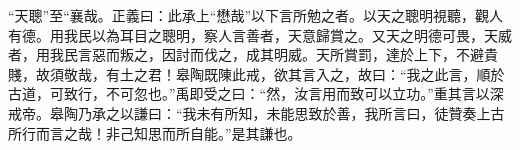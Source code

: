 {\noindent\shu{}\fzkt “天聰”至“襄哉。正義曰：此承上“懋哉”以下言所勉之者。以天之聰明視聽，觀人有德。用我民以為耳目之聰明，察人言善者，天意歸賞之。又天之明德可畏，天威者，用我民言惡而叛之，因討而伐之，成其明威。天所賞罰，達於上下，不避貴賤，故須敬哉，有土之君！皋陶既陳此戒，欲其言入之，故曰：“我之此言，順於古道，可致行，不可忽也。”禹即受之曰：“然，汝言用而致可以立功。”重其言以深戒帝。皋陶乃承之以謙曰：“我未有所知，未能思致於善，我所言曰，徒贊奏上古所行而言之哉！非己知思而所自能。”是其謙也。 \par}

